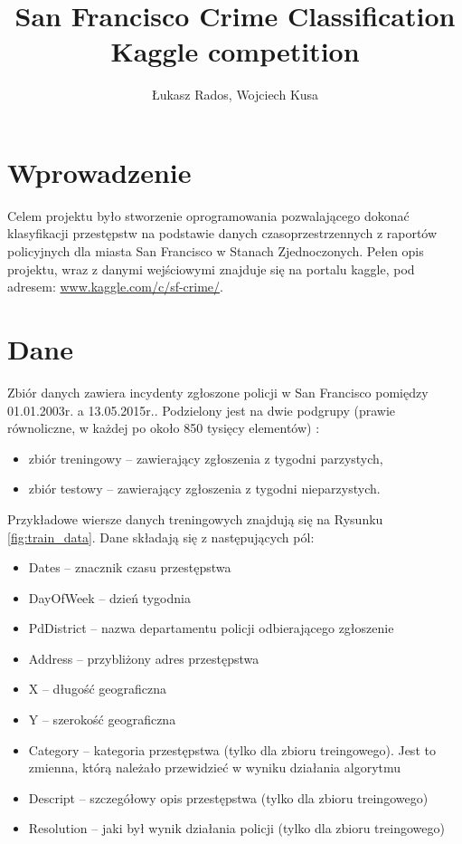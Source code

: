 \documentclass[11pt]{article} %
\title{San Francisco Crime Classification\\ \large{Kaggle competition  }}
\author{Łukasz Rados, Wojciech Kusa}
\affil{Wydział Fizyki i Informatyki Stosowanej \\ Akademia Górniczo-Hutnicza w Krakowie}
\begin{document}
\maketitle

\section{Wprowadzenie}

Celem projektu było stworzenie oprogramowania pozwalającego dokonać klasyfikacji przestępstw na podstawie danych czasoprzestrzennych z raportów policyjnych dla miasta San Francisco w Stanach Zjednoczonych. Pełen opis projektu, wraz z danymi wejściowymi znajduje się na portalu kaggle, pod adresem: \url{www.kaggle.com/c/sf-crime/}.


\section{Dane} \label{sec:data}

Zbiór danych zawiera incydenty zgłoszone policji w San Francisco pomiędzy 01.01.2003r. a 13.05.2015r.. Podzielony jest na dwie podgrupy (prawie równoliczne, w każdej po około 850 tysięcy elementów) :
\begin{itemize}
\item zbiór treningowy -- zawierający zgłoszenia z tygodni parzystych,

\item zbiór testowy --  zawierający zgłoszenia z tygodni nieparzystych.
\end{itemize} 

Przykładowe wiersze danych treningowych znajdują się na Rysunku \ref{fig:train_data}. Dane składają się z następujących pól:

\begin{itemize}
\item Dates -- znacznik czasu przestępstwa
\item DayOfWeek -- dzień tygodnia
\item PdDistrict -- nazwa departamentu policji odbierającego zgłoszenie
\item Address -- przybliżony adres przestępstwa
\item X -- długość geograficzna
\item Y -- szerokość geograficzna
\item Category -- kategoria przestępstwa (tylko dla zbioru treingowego). Jest to zmienna, którą należało przewidzieć w wyniku działania algorytmu
\item Descript -- szczegółowy opis przestępstwa (tylko dla zbioru treingowego)
\item Resolution -- jaki był wynik działania policji (tylko dla zbioru treingowego)

\end{itemize}
\end{document}
